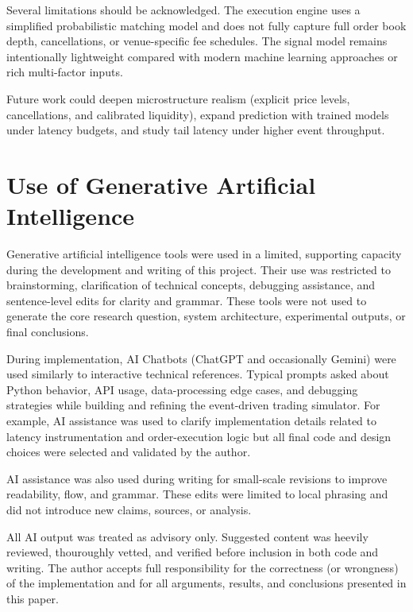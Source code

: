 \documentclass[12pt]{article}
\begin{document}
Several limitations should be acknowledged. The execution engine uses a 
simplified probabilistic matching model and does not fully capture full order 
book depth, cancellations, or venue-specific fee schedules. The signal model 
remains intentionally lightweight compared with modern machine learning 
approaches or rich multi-factor inputs.

Future work could deepen microstructure realism (explicit price levels, 
cancellations, and calibrated liquidity), expand prediction with trained 
models under latency budgets, and study tail latency under higher event 
throughput.

\appendix
\section{Use of Generative Artificial Intelligence}
Generative artificial intelligence tools were used in a limited, supporting
capacity during the development and writing of this project. Their use was
restricted to brainstorming, clarification of technical concepts, debugging
assistance, and sentence-level edits for clarity and grammar. These tools were
not used to generate the core research question, system architecture,
experimental outputs, or final conclusions.

During implementation, AI Chatbots (ChatGPT and
occasionally Gemini) were used similarly to interactive technical references.
Typical prompts asked about Python behavior, API usage, data-processing edge
cases, and debugging strategies while building and refining the event-driven
trading simulator. For example, AI assistance was used to clarify
implementation details related to latency instrumentation and order-execution
logic but all final code and design choices
were selected and validated by the author.

AI assistance was also used during writing for small-scale revisions to improve
readability, flow, and grammar. These edits were limited to local phrasing and
did not introduce new claims, sources, or analysis. 

All AI output was treated as advisory only. Suggested content was heevily reviewed,
thouroughly vetted, and verified before inclusion in both code and writing. The author
accepts full responsibility for the correctness (or wrongness) of the implementation and for
all arguments, results, and conclusions presented in this paper.




\end{document}
